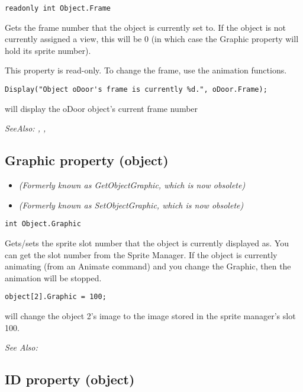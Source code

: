 \begin{verbatim}
readonly int Object.Frame
\end{verbatim}
Gets the frame number that the object is currently set to. If the object is not currently
assigned a view, this will be 0 (in which case the Graphic property will
hold its sprite number).

This property is read-only. To change the frame, use the animation functions.

\begin{verbatim}
Display("Object oDoor's frame is currently %d.", oDoor.Frame);
\end{verbatim}
will display the oDoor object's current frame number

\it{SeeAlso:} ,
,


\subsection{Graphic property (object)}\label{Object.Graphic}%

\begin{itemize}
\item \it{(Formerly known as GetObjectGraphic, which is now obsolete)}
\item \it{(Formerly known as SetObjectGraphic, which is now obsolete)}
\end{itemize}

\begin{verbatim}
int Object.Graphic
\end{verbatim}
Gets/sets the sprite slot number that the object is currently displayed as.
You can get the slot number from the Sprite Manager. If the object is
currently animating (from an Animate command) and you change the Graphic, then the
animation will be stopped.

\begin{verbatim}
object[2].Graphic = 100;
\end{verbatim}
will change the object 2's image to the image stored in the sprite manager's slot 100.

\it{See Also:} 


\subsection{ID property (object)}\label{Object.ID}%

